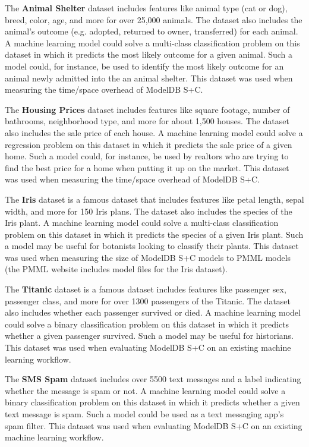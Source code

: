 The \textbf{Animal Shelter} dataset \cite{animal} includes features like
animal type (cat or dog), breed, color, age, and more for over 25,000 animals. The
dataset also includes the animal's outcome (e.g. adopted, returned to owner, transferred)
for each animal. A machine learning model could solve a multi-class classification problem on this dataset
in which it predicts the most likely outcome for a given animal. Such a model could, for
instance, be used to identify the most likely outcome for an animal newly admitted into the
an animal shelter. This dataset was used when measuring the time/space overhead
of ModelDB S+C.

The \textbf{Housing Prices} dataset \cite{housing} includes features like square
footage, number of bathrooms, neighborhood type, and more for about 1,500 houses.
The dataset also includes the sale price of each house. A machine learning model
could solve a regression problem on this dataset in which it predicts the sale
price of a given home. Such a model could, for instance, be used by realtors who
are trying to find the best price for a home when putting it up on the market. This
dataset was used when measuring the time/space overhead of ModelDB S+C.

The \textbf{Iris} dataset \cite{iris} is a famous dataset that includes features
like petal length, sepal width, and more for 150 Iris plans. The dataset also
includes the species of the Iris plant. A machine learning model could solve a 
multi-class classification problem on this dataset in which it predicts the species
of a given Iris plant. Such a model may be useful for botanists looking to classify
their plants. This dataset was used when measuring the size of ModelDB S+C models
to PMML models (the PMML website includes model files for the Iris dataset).

The \textbf{Titanic} dataset \cite{titanic} is a famous dataset includes features like 
passenger sex, passenger class, and more for over 1300 passengers of the Titanic. 
The dataset also includes whether each passenger survived or died. A machine learning
model could solve a binary classification problem on this dataset in which it predicts whether
a given passenger survived. Such a model may be useful for historians. This dataset
was used when evaluating ModelDB S+C on an existing machine learning workflow.

The \textbf{SMS Spam} dataset \cite{spam} includes over 5500 text messages and
a label indicating whether the message is spam or not. A machine learning model
could solve a binary classification problem on this dataset in which it predicts
whether a given text message is spam. Such a model could be used as a text messaging
app's spam filter. This dataset was used when evaluating ModelDB S+C on an existing
machine learning workflow.

